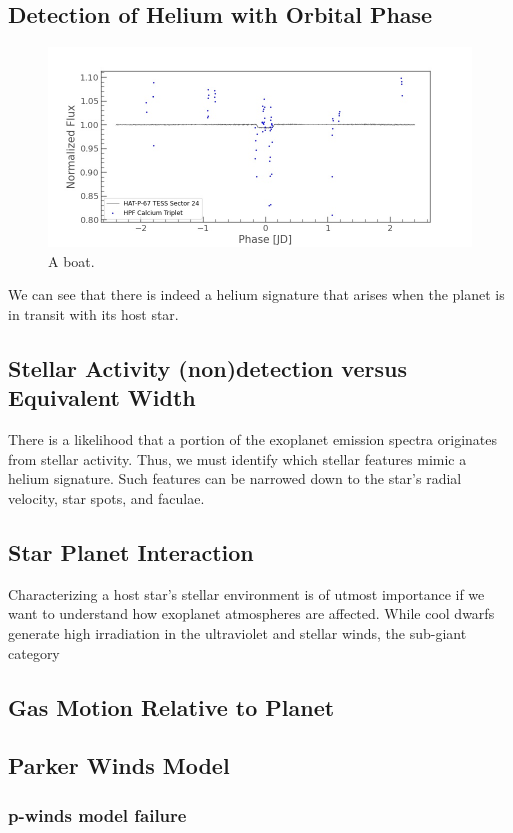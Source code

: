 \documentclass[twocolumn]{aastex631}
\begin{document}
\subsection{Detection of Helium with Orbital Phase}
\begin{figure}
    \includegraphics[width=\linewidth]{figures/TESS_EW_HAT-P-67.jpg}
    \caption{A boat.}
    \label{fig:boat1}
\end{figure}
We can see that there is indeed a helium signature that arises when the planet is in transit with its host star.
\subsection{Stellar Activity (non)detection versus Equivalent Width}
There is a likelihood that a portion of the exoplanet emission spectra originates from stellar activity. Thus, we must identify which stellar features mimic a helium signature. Such features can be narrowed down to the star's radial velocity, star spots, and faculae.
\subsection{Star Planet Interaction}
Characterizing a host star's stellar environment is of utmost importance if we want to understand how exoplanet atmospheres are affected. While cool dwarfs generate high irradiation in the ultraviolet and stellar winds, the sub-giant category
\subsection{Gas Motion Relative to Planet}
\subsection{Parker Winds Model}
\subsubsection{p-winds model failure}
\end{document}
